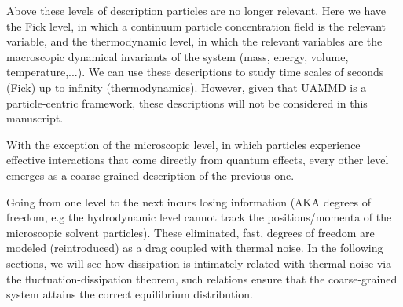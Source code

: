 \documentclass[ twoside,openright,titlepage,numbers=noenddot,%
headinclude,footinclude,cleardoublepage=empty,abstract=on,
BCOR=5mm,paper=a4,fontsize=11pt, dvipsnames
]{scrreprt}
\newcommand{\uammd}{\gls{UAMMD}\xspace}
\begin{document}
Above these levels of description particles are no longer relevant. Here we have the Fick level, in which a continuum particle concentration field is the relevant variable, and the thermodynamic level, in which the relevant variables are the macroscopic dynamical invariants of the system (mass, energy, volume, temperature,...). We can use these descriptions to study time scales of seconds (Fick) up to infinity (thermodynamics). However, given that \uammd is a particle-centric framework, these descriptions will not be considered in this manuscript.


With the exception of the microscopic level, in which particles experience effective interactions that come directly from quantum effects, every other level emerges as a coarse grained description of the previous one. 

Going from one level to the next incurs losing information (AKA degrees of freedom, e.g the hydrodynamic level cannot track the positions/momenta of the microscopic solvent particles). These eliminated, fast, degrees of freedom are modeled (reintroduced) as a drag coupled with thermal noise. In the following sections, we will see how dissipation is intimately related with thermal noise via the fluctuation-dissipation theorem, such relations ensure that the coarse-grained system attains the correct equilibrium distribution.
\end{document}
